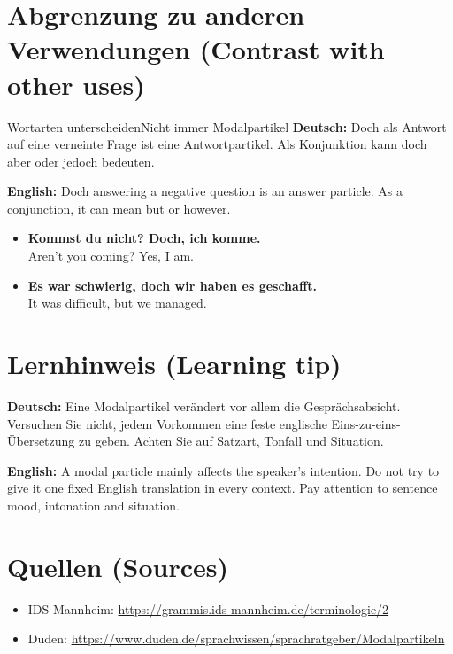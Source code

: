 \documentclass[a4paper,11pt]{article}
\newcommand{\GermanText}[1]{\textbf{Deutsch: }#1\par}
\newcommand{\EnglishText}[1]{{\small\color{SoftGray}\textbf{English: }#1\par}}
\newcommand{\ExampleItem}[2]{\item \textbf{#1}\\{\small\color{SoftGray}#2}}
\begin{document}
\section{Abgrenzung zu anderen Verwendungen \textnormal{(Contrast with other uses)}}
\begin{grammarentry}{Wortarten unterscheiden}{Nicht immer Modalpartikel}
\GermanText{Doch als Antwort auf eine verneinte Frage ist eine Antwortpartikel. Als Konjunktion kann doch aber oder jedoch bedeuten.}
\EnglishText{Doch answering a negative question is an answer particle. As a conjunction, it can mean but or however.}
\end{grammarentry}
\begin{exbox}\begin{itemize}
\ExampleItem{Kommst du nicht? Doch, ich komme.}{Aren't you coming? Yes, I am.}
\ExampleItem{Es war schwierig, doch wir haben es geschafft.}{It was difficult, but we managed.}
\end{itemize}\end{exbox}
\section{Lernhinweis \textnormal{(Learning tip)}}
\GermanText{Eine Modalpartikel verändert vor allem die Gesprächsabsicht. Versuchen Sie nicht, jedem Vorkommen eine feste englische Eins-zu-eins-Übersetzung zu geben. Achten Sie auf Satzart, Tonfall und Situation.}
\EnglishText{A modal particle mainly affects the speaker's intention. Do not try to give it one fixed English translation in every context. Pay attention to sentence mood, intonation and situation.}
\section{Quellen \textnormal{(Sources)}}
\begin{itemize}
\item IDS Mannheim: \url{https://grammis.ids-mannheim.de/terminologie/2}
\item Duden: \url{https://www.duden.de/sprachwissen/sprachratgeber/Modalpartikeln}
\end{itemize}
\end{document}
